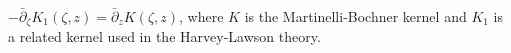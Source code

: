 
$-\bar{\partial}_{\zeta} K_1(\zeta, z) = \bar{\partial}_z K(\zeta, z)$, where $K$ is the Martinelli-Bochner kernel and $K_1$ is a related kernel used in the Harvey-Lawson theory.
